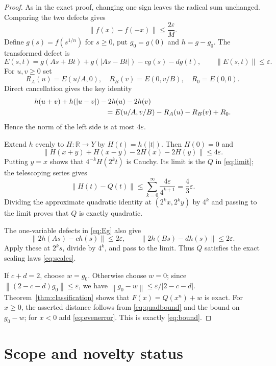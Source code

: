 \documentclass[11pt]{article}
\newcommand{\R}{\mathbb R}
\newcommand{\norm}[1]{\left\lVert#1\right\rVert}
\begin{document}
\begin{proof}
As in the exact proof, changing one sign leaves the radical sum unchanged.
Comparing the two defects gives
\begin{equation}\label{eq:evenerror}
 \norm{f(x)-f(-x)}\leq\frac{2\varepsilon}{M}.
\end{equation}
Define $g(s)=f(s^{1/n})$ for $s\geq0$, put $g_0=g(0)$ and
$h=g-g_0$.  The transformed defect is
\begin{equation}\label{eq:Eg}
 E(s,t)=g(As+Bt)+g(|As-Bt|)-cg(s)-dg(t),\qquad
 \norm{E(s,t)}\leq\varepsilon.
\end{equation}
For $u,v\geq0$ set
\[
 R_A(u)=E(u/A,0),\quad R_B(v)=E(0,v/B),\quad R_0=E(0,0).
\]
Direct cancellation gives the key identity
\begin{align}\label{eq:keyidentity}
 &h(u+v)+h(|u-v|)-2h(u)-2h(v)\\
 &\hspace{35mm}=E(u/A,v/B)-R_A(u)-R_B(v)+R_0.\nonumber
\end{align}
Hence the norm of the left side is at most $4\varepsilon$.

Extend $h$ evenly to $H:\R\to Y$ by $H(t)=h(|t|)$.  Then $H(0)=0$ and
\[
 \norm{H(x+y)+H(x-y)-2H(x)-2H(y)}\leq4\varepsilon.
\]
Putting $y=x$ shows that $4^{-k}H(2^kt)$ is Cauchy.  Its limit is the
$Q$ in \eqref{eq:limit}; the telescoping series gives
\begin{equation}\label{eq:quadbound}
 \norm{H(t)-Q(t)}
 \leq\sum_{k=0}^{\infty}\frac{4\varepsilon}{4^{k+1}}
 =\frac{4}{3}\varepsilon.
\end{equation}
Dividing the approximate quadratic identity at $(2^kx,2^ky)$ by $4^k$
and passing to the limit proves that $Q$ is exactly quadratic.

The one-variable defects in \eqref{eq:Eg} also give
\[
 \norm{2h(As)-ch(s)}\leq2\varepsilon,\qquad
 \norm{2h(Bs)-dh(s)}\leq2\varepsilon.
\]
Apply these at $2^ks$, divide by $4^k$, and pass to the limit.  Thus $Q$
satisfies the exact scaling laws \eqref{eq:scales}.

If $c+d=2$, choose $w=g_0$.  Otherwise choose $w=0$; since
$\norm{(2-c-d)g_0}\leq\varepsilon$, we have
$\norm{g_0-w}\leq\varepsilon/|2-c-d|$.  Theorem~\ref{thm:classification}
shows that $F(x)=Q(x^n)+w$ is exact.  For $x\geq0$, the asserted distance
follows from \eqref{eq:quadbound} and the bound on $g_0-w$; for $x<0$ add
\eqref{eq:evenerror}.  This is exactly \eqref{eq:bound}.
\end{proof}

\section{Scope and novelty status}
\end{document}
